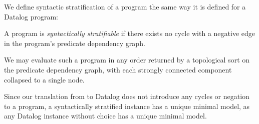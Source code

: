 
We define syntactic stratification of a \slang program the same way it is
defined for a Datalog program:

\begin{definition}
%
A \slang program is \emph{syntactically stratifiable} if there
exists no cycle with a negative edge 
in the program's
predicate dependency graph.
%
\end{definition}


We may evaluate such a program in any order returned by a topological sort on
the predicate dependency graph, with each strongly connected component
collapsed to a single node.

Since our translation from \slang to Datalog does not introduce any cycles or
negation to a program, a syntactically stratified \slang instance has a
unique minimal model, as any Datalog instance without choice has a unique
minimal model. 

%
%

%

%

